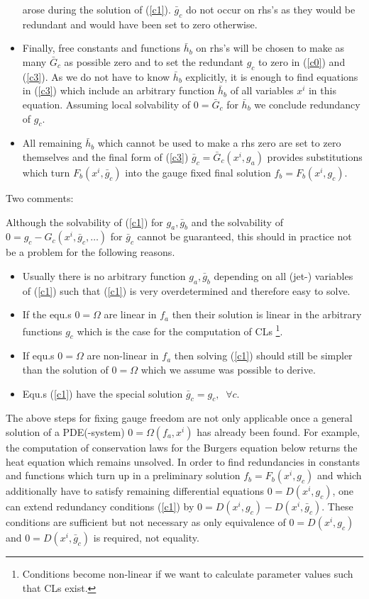 \begin{itemize}
arose during the solution of (\ref{c1}). $\bar{g}_c$ do not occur on rhs's
as they would be redundant and would have been set to zero otherwise.
\item
Finally, free constants and functions $\bar{h}_b$ on rhs's will be chosen
to make as many $\bar{G}_c$ as possible zero
and to set the redundant $g_c$ to zero in (\ref{c0}) and (\ref{c3}).
As we do not have to know $\bar{h}_b$ explicitly, it is enough to find
equations in (\ref{c3}) which include an arbitrary function $\bar{h}_b$
of all variables $x^i$ in this equation. Assuming local solvability
of $0 = \bar{G}_c$ for $\bar{h}_b$ we conclude redundancy of $g_c$.
\item
All remaining $\bar{h}_b$ which cannot be used to make a rhs zero are
set to zero themselves and the final form of (\ref{c3})
$\bar{g}_c = \bar{G}_c(x^i,g_a)$ provides substitutions which turn
$F_b(x^i,\bar{g}_c)$ into the gauge fixed final solution
$f_b = F_b(x^i,g_c)$.
\end{itemize}
\noindent Two comments:

Although the solvability of (\ref{c1}) for $g_a,\bar{g}_b$ and the
solvability of $0 = g_c - G_c(x^i,\bar{g}_c,\ldots)$ for $\bar{g}_c$ cannot
be guaranteed, this should in practice not be a problem for the
following reasons.
\begin{itemize}
\item
Usually there is no arbitrary function $g_a,\bar{g}_b$ depending
on all (jet-) variables
of (\ref{c1}) such that (\ref{c1}) is very overdetermined and
therefore easy to solve.
\item
If the equ.s $0=\Omega$ are linear in $f_a$ then their solution is
linear in the arbitrary functions $g_c$ which is the case for the
computation of CLs \footnote{Conditions become non-linear
if we want to calculate parameter values such that CLs exist.}.
\item
If equ.s $0=\Omega$ are non-linear in $f_a$ then
solving (\ref{c1}) should still be simpler than the solution of $0=\Omega$
which we assume was possible to derive.
\item
Equ.s (\ref{c1}) have the special
solution $\bar{g}_c = g_c, \;\;\forall c$.
\end{itemize}


The above steps for fixing gauge freedom are not only
applicable once a general solution of a PDE(-system)
$0 = \Omega(f_a,x^i)$ has already been found. For example, the
computation of conservation laws for the Burgers equation below
returns the heat equation which remains unsolved.
In order to find redundancies in constants and functions which
turn up in a preliminary solution $f_b = F_b(x^i,g_c)$ and
which additionally have to satisfy remaining differential equations
$0 = D(x^i,g_c)$, one can extend redundancy conditions (\ref{c1})
by $ 0 = D(x^i,g_c) - D(x^i,\bar{g}_c)$. These conditions are sufficient
but not necessary as only equivalence of $0=D(x^i,g_c)$ and
$0=D(x^i,\bar{g}_c)$ is required, not equality.

